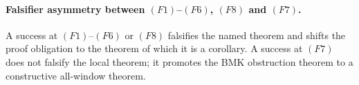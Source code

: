 \begin{enumerate}
\end{enumerate}

\paragraph{Falsifier asymmetry between \((F1)\)--\((F6)\), \((F8)\) and
\((F7)\).}
A success at \((F1)\)--\((F6)\) or \((F8)\) falsifies the named theorem
and shifts the proof obligation to the theorem of which it is a
corollary.  A success at \((F7)\) does not falsify the local theorem;
it promotes the BMK obstruction theorem to a constructive all-window
theorem.

\endgroup
